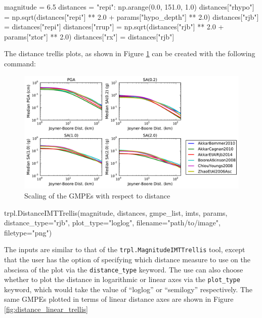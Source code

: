 \begin{python}
magnitude = 6.5
distances = {"repi": np.arange(0.0, 151.0, 1.0)}
distances["rhypo"] = np.sqrt(distances["repi"] ** 2.0 +
                             params["hypo_depth"] ** 2.0)
distances["rjb"] = distances["repi"]
distances["rrup"] = np.sqrt(distances["rjb"] ** 2.0 +
                            params["ztor"] ** 2.0)
distances["rx"] = distances["rjb"]
\end{python}

The distance trellis plots, as shown in Figure \ref{fig:distance_trellis_simple} can be created with the following command:

\begin{figure}[htb]
	\centering
		\includegraphics[width=\textwidth]{./figures/trellis/distance_imt_trellis_simple.pdf}
	\caption{Scaling of the GMPEs with respect to distance}
	\label{fig:distance_trellis_simple}
\end{figure}

\begin{python}
trpl.DistanceIMTTrellis(magnitude,
                        distances, 
                        gmpe_list,
                        imts,
                        params,
                        distance_type="rjb",
                        plot_type="loglog",
                        filename="path/to/image",
                        filetype="png")
\end{python}

The inputs are similar to that of the \verb=trpl.MagnitudeIMTTrellis= tool, except that the user has the option of specifying which distance measure to use on the abscissa of the plot via the \verb=distance_type= keyword. The use can also choose whether to plot the distance in logarithmic or linear axes via the \verb=plot_type= keyword, which would take the value of ``loglog'' or ``semilogy'' respectively. The same GMPEs plotted in terms of linear distance axes are shown in Figure \ref{fig:distance_linear_trellis}

